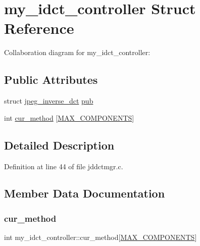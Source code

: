 \hypertarget{structmy__idct__controller}{}\section{my\+\_\+idct\+\_\+controller Struct Reference}
\label{structmy__idct__controller}


Collaboration diagram for my\+\_\+idct\+\_\+controller\+:
\subsection*{Public Attributes}
\begin{DoxyCompactItemize}
\item 
struct \mbox{\hyperlink{structjpeg__inverse__dct}{jpeg\+\_\+inverse\+\_\+dct}} \mbox{\hyperlink{structmy__idct__controller_ace0aef71b868fc10da51a4be6f8b56ca}{pub}}
\item 
int \mbox{\hyperlink{structmy__idct__controller_ac13e3955a30c7b2a75c835dc803182cb}{cur\+\_\+method}} \mbox{[}\mbox{\hyperlink{jmorecfg_8h_a6d8c910a1fdb6d4762a05f7250e64322}{M\+A\+X\+\_\+\+C\+O\+M\+P\+O\+N\+E\+N\+TS}}\mbox{]}
\end{DoxyCompactItemize}


\subsection{Detailed Description}


Definition at line 44 of file jddctmgr.\+c.



\subsection{Member Data Documentation}
\mbox{\label{structmy__idct__controller_ac13e3955a30c7b2a75c835dc803182cb}} 
\subsubsection{\texorpdfstring{cur\_method}{cur\_method}}
{\footnotesize\ttfamily int my\+\_\+idct\+\_\+controller\+::cur\+\_\+method\mbox{[}\mbox{\hyperlink{jmorecfg_8h_a6d8c910a1fdb6d4762a05f7250e64322}{M\+A\+X\+\_\+\+C\+O\+M\+P\+O\+N\+E\+N\+TS}}\mbox{]}}



